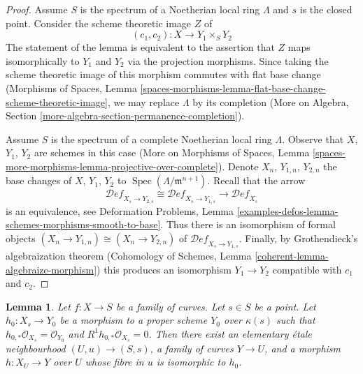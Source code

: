 \documentclass{stacks-project}
\theoremstyle{plain}
\newtheorem{lemma}[subsection]{Lemma}
\theoremstyle{definition}
\theoremstyle{remark}
\numberwithin{equation}{subsection}
\def\Spec{\mathop{\mathrm{Spec}}}
\def\Deformationcategory{\mathcal{D}\!\mathit{ef}}
\begin{document}
\begin{proof}
\medskip\noindent
Assume $S$ is the spectrum of a Noetherian local ring $\Lambda$ and
$s$ is the closed point. Consider the scheme theoretic image $Z$ of
$$
(c_1, c_2) : X \longrightarrow Y_1 \times_S Y_2
$$
The statement of the lemma is equivalent to the assertion that $Z$ maps
isomorphically to $Y_1$ and $Y_2$ via the projection morphisms.
Since taking the scheme theoretic image of this morphism commutes
with flat base change (Morphisms of Spaces, Lemma
\ref{spaces-morphisms-lemma-flat-base-change-scheme-theoretic-image},
we may replace $\Lambda$ by its completion
(More on Algebra, Section \ref{more-algebra-section-permanence-completion}).

\medskip\noindent
Assume $S$ is the spectrum of a complete Noetherian local ring $\Lambda$.
Observe that $X$, $Y_1$, $Y_2$ are schemes in this case
(More on Morphisms of Spaces, Lemma
\ref{spaces-more-morphisms-lemma-projective-over-complete}).
Denote $X_n$, $Y_{1, n}$, $Y_{2, n}$ the base changes of
$X$, $Y_1$, $Y_2$ to $\Spec(\Lambda/\mathfrak m^{n + 1})$.
Recall that the arrow
$$
\Deformationcategory_{X_s \to Y_{2, s}} \cong
\Deformationcategory_{X_s \to Y_{1, s}} \longrightarrow
\Deformationcategory_{X_s}
$$
is an equivalence, see Deformation Problems, Lemma
\ref{examples-defos-lemma-schemes-morphisms-smooth-to-base}.
Thus there is an isomorphism of formal objects
$(X_n \to Y_{1, n}) \cong (X_n \to Y_{2, n})$
of $\Deformationcategory_{X_s \to Y_{1, s}}$.
Finally, by Grothendieck's algebraization theorem
(Cohomology of Schemes, Lemma \ref{coherent-lemma-algebraize-morphism})
this produces an isomorphism $Y_1 \to Y_2$ compatible with $c_1$ and $c_2$.
\end{proof}

\begin{lemma}
\label{lemma-contract-basic}
Let $f : X \to S$ be a family of curves. Let $s \in S$ be a point.
Let $h_0 : X_s \to Y_0$ be a morphism to a proper scheme $Y_0$ over $\kappa(s)$
such that $h_{0, *}\mathcal{O}_{X_s} = \mathcal{O}_{Y_0}$ and
$R^1h_{0, *}\mathcal{O}_{X_s} = 0$. Then there exist an elementary
\'etale neighbourhood $(U, u) \to (S, s)$, a family of curves $Y \to U$,
and a morphism $h : X_U \to Y$ over $U$ whose fibre in $u$
is isomorphic to $h_0$.
\end{lemma}
\end{document}

